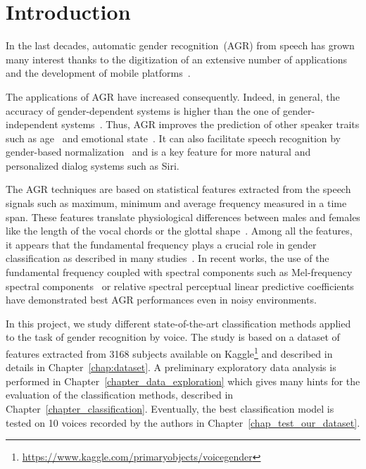 

\chapter{Introduction}
\label{chap:introduction}

In the last decades, automatic gender recognition~(AGR) from speech has grown many interest thanks to the digitization of an extensive number of applications and the development of mobile platforms~\cite{Wu_JASA_1991, Wu_JASA_1991_2, Childers_ICASSP_1988, Harb2005, Zeng2006, Sorokin2008, Metze_ICASSP_2007, Bocklet_ICASSP_2008}.

The applications of AGR have increased consequently. Indeed, in general, the accuracy of gender-dependent systems is higher than the one of gender-independent systems~\cite{Harb2005}. Thus, AGR improves the prediction of other speaker traits such as age~\cite{Levi2015} and emotional state~\cite{Bisio2013, Ververidis2004}. It can also facilitate speech recognition by gender-based normalization~\cite{Wegmann_ICASSP_1996} and is a key feature for more natural and personalized dialog systems such as Siri.

The AGR techniques are based on statistical features extracted from the speech signals such as maximum, minimum and average frequency measured in a time span. These features translate physiological differences between males and females like the length of the vocal chords or the glottal shape~\cite{Titze_JASA_1989}. Among all the features, it appears that the fundamental frequency plays a crucial role in gender classification as described in many studies~\cite{Hollien1967, Wu_JASA_1991, Poon2015}. In recent works, the use of the fundamental frequency coupled with spectral components such as Mel-frequency spectral components~\cite{Gupta2016} or relative spectral perceptual linear predictive coefficients~\cite{Zeng2006} have demonstrated best AGR performances even in noisy environments.

In this project, we study different state-of-the-art classification methods applied to the task of gender recognition by voice. The study is based on a dataset of features extracted from \num{3168} subjects available on Kaggle\footnote{\url{https://www.kaggle.com/primaryobjects/voicegender}} and described in details in Chapter~\ref{chap:dataset}. A preliminary exploratory data analysis is performed in Chapter~\ref{chapter_data_exploration} which gives many hints for the evaluation of the classification methods, described in Chapter~\ref{chapter_classification}. Eventually, the best classification model is tested on \num{10} voices recorded by the authors in Chapter~\ref{chap_test_our_dataset}.
  